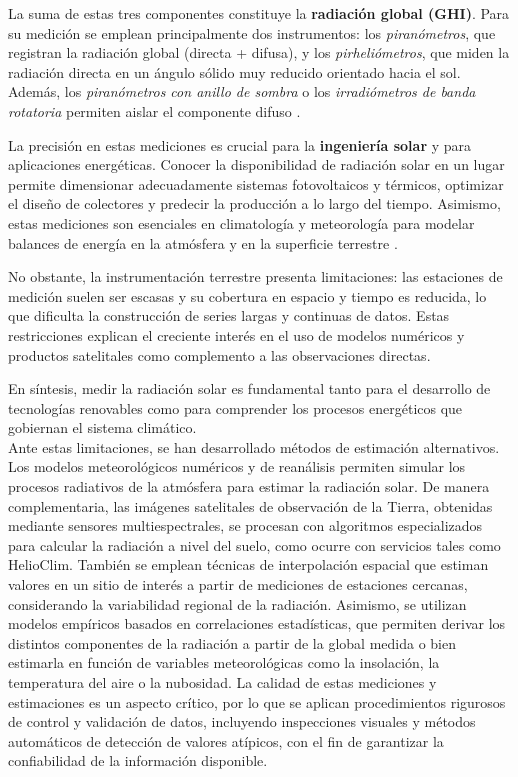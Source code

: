 La suma de estas tres componentes constituye la \textbf{radiación global (GHI)}. Para su medición se emplean principalmente dos instrumentos: los \textit{piranómetros}, que registran la radiación global (directa + difusa), y los \textit{pirheliómetros}, que miden la radiación directa en un ángulo sólido muy reducido orientado hacia el sol. Además, los \textit{piranómetros con anillo de sombra} o los \textit{irradiómetros de banda rotatoria} permiten aislar el componente difuso \citep{duffie2013}.  

La precisión en estas mediciones es crucial para la \textbf{ingeniería solar} y para aplicaciones energéticas. Conocer la disponibilidad de radiación solar en un lugar permite dimensionar adecuadamente sistemas fotovoltaicos y térmicos, optimizar el diseño de colectores y predecir la producción a lo largo del tiempo. Asimismo, estas mediciones son esenciales en climatología y meteorología para modelar balances de energía en la atmósfera y en la superficie terrestre \citep{wald2018, ieapvps2023}.  

No obstante, la instrumentación terrestre presenta limitaciones: las estaciones de medición suelen ser escasas y su cobertura en espacio y tiempo es reducida, lo que dificulta la construcción de series largas y continuas de datos. Estas restricciones explican el creciente interés en el uso de modelos numéricos y productos satelitales como complemento a las observaciones directas.  

En síntesis, medir la radiación solar es fundamental tanto para el desarrollo de tecnologías renovables como para comprender los procesos energéticos que gobiernan el sistema climático.\\



Ante estas limitaciones, se han desarrollado métodos de estimación alternativos. Los modelos meteorológicos numéricos y de reanálisis permiten simular los procesos radiativos de la atmósfera para estimar la radiación solar. De manera complementaria, las imágenes satelitales de observación de la Tierra, obtenidas mediante sensores multiespectrales, se procesan con algoritmos especializados para calcular la radiación a nivel del suelo, como ocurre con servicios tales como HelioClim. También se emplean técnicas de interpolación espacial que estiman valores en un sitio de interés a partir de mediciones de estaciones cercanas, considerando la variabilidad regional de la radiación. Asimismo, se utilizan modelos empíricos basados en correlaciones estadísticas, que permiten derivar los distintos componentes de la radiación a partir de la global medida o bien estimarla en función de variables meteorológicas como la insolación, la temperatura del aire o la nubosidad. La calidad de estas mediciones y estimaciones es un aspecto crítico, por lo que se aplican procedimientos rigurosos de control y validación de datos, incluyendo inspecciones visuales y métodos automáticos de detección de valores atípicos, con el fin de garantizar la confiabilidad de la información disponible.





